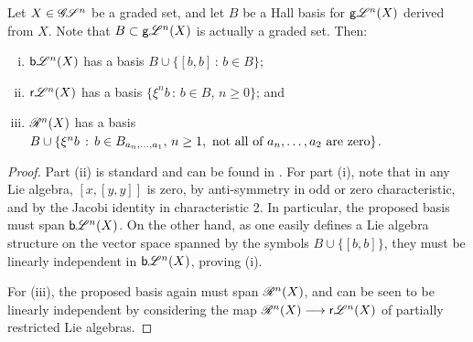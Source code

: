 \documentclass[11pt]{article}
\newcommand{\RestLie}[1]{\mathsf{r}{\scrL}^{#1}}%
\newcommand{\GoodLie}[1]{\mathsf{g}{\scrL}^{#1}}%
\newcommand{\BadLie}[1]{\mathsf{b}{\scrL}^{#1}}%
\newcommand{\PRLie}[1]{\scrR^{#1}}%
\newcommand{\GS}[1]{\scrG\!\scrS^{#1}}
\newcommand{\iteratedrestn}[2]{\xi^{#2}{#1}}
\newcommand{\Fr}[1]{#1}%
\begin{document}
\begin{CategoriesOfInterest}
\begin{prop*}
Let $X\in\GS{n}$ be a graded set, and let $B$ be a Hall basis for $\Fr{\GoodLie{n}}(X)$ derived from $X$. Note that $B\subset \Fr{\GoodLie{n}}(X)$ is actually a graded set. Then:
\begin{enumerate}[i)]\squishlist
\setlength{\parindent}{.25in}
\item $\Fr{\BadLie{n}}(X)$ has a basis $B\cup\{[b,b]\,:\,b\in B\}$;
\item $\Fr{\RestLie{n}}(X)$ has a basis $\{\iteratedrestn{b}{n}\,:\,b\in B,\,n\geq0\}$; and
\item $\Fr{\PRLie{n}}(X)$ has a basis $B\cup \{\iteratedrestn{b}{n}\,:\,b\in B_{a_{n},\ldots,a_1},\,n\geq1,\textup{ not all of $a_n,\ldots,a_2$ are zero}\}$.
\end{enumerate}
\end{prop*}
\begin{proof}
Part (ii) is standard and can be found in \cite[Proposition 14, p.66]{MR886063}.
For part (i), note that in any Lie algebra, $[x,[y,y]]$ is zero, by anti-symmetry in odd or zero characteristic, and by the Jacobi identity in characteristic 2. In particular, the proposed basis must span $\Fr{\BadLie{n}}(X)$. On the other hand, as one easily defines a Lie algebra structure on the vector space spanned by the symbols $B\cup\{[b,b]\}$, they must be linearly independent in $\Fr{\BadLie{n}}(X)$, proving (i).

For (iii), the proposed basis again must span $\Fr{\PRLie{n}}(X)$, and can be seen to be linearly independent by considering the map $\Fr{\PRLie{n}}(X)\to \Fr{\RestLie{n}}(X)$ of partially restricted Lie algebras.
\end{proof}







\end{CategoriesOfInterest}
\end{document}
